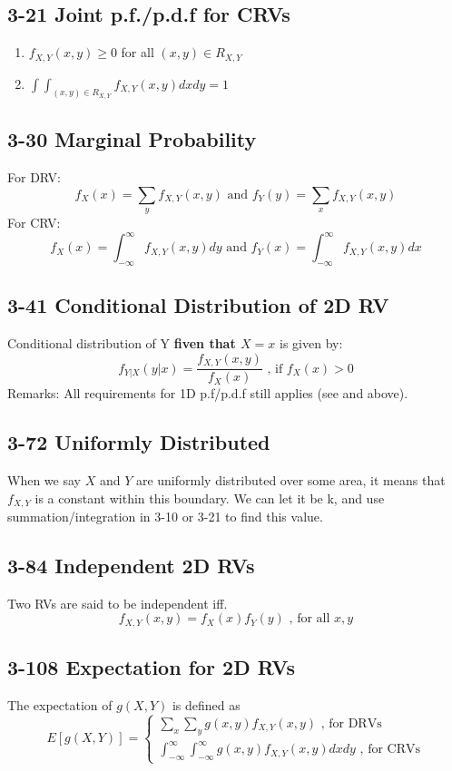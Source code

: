 \documentclass[12pt,landscape]{article}
\begin{document}
\begin{multicols}{3}
    \subsection{3-21 Joint p.f./p.d.f for CRVs}
    \begin{enumerate}
        \item $f_{X,Y}(x,y) \geq 0$ for all $(x, y) \in R_{X,Y}$
        \item $\int\int_{(x,y) \in R_{X,Y}} f_{X,Y}(x,y)dxdy = 1$
    \end{enumerate}
    
    \subsection{3-30 Marginal Probability}
    For DRV:
        $$ f_X(x) = \sum_y f_{X,Y}(x,y) \text{ and } f_Y(y) = \sum_x f_{X,Y}(x,y) $$
    For CRV:
        $$ f_X(x) = \int_{-\infty}^{\infty} f_{X,Y}(x,y)dy \text{ and } f_Y(x) = \int_{-\infty}^{\infty} f_{X,Y}(x,y)dx $$
    
    \subsection{3-41 Conditional Distribution of 2D RV}
    Conditional distribution of Y \textbf{fiven that $X = x$} is given by:
        $$ f_{Y|X}(y|x) = \frac{f_{X,Y}(x,y)}{f_X(x)} \text{ , if } f_X(x) > 0 $$
    Remarks: All requirements for 1D p.f/p.d.f still applies (see  and  above).

    \subsection{3-72 Uniformly Distributed}
    When we say $X$ and $Y$ are uniformly distributed over some area, it means that $f_{X,Y}$ is a constant
    within this boundary. We can let it be k, and use summation/integration in 3-10 or 3-21 to find this value.

    \subsection{3-84 Independent 2D RVs}
    Two RVs are said to be independent iff.
        $$ f_{X,Y}(x,y) = f_X(x)f_Y(y) \text{ , for all } x,y $$
    

    \subsection{3-108 Expectation for 2D RVs}
    The expectation of $g(X,Y)$ is defined as
        $$
            E[g(X,Y)] = \begin{cases}
                \sum_x \sum_y g(x,y)f_{X,Y}(x,y) \text{ , for DRVs} \\
                \int_{-\infty}^{\infty} \int_{-\infty}^{\infty} g(x,y)f_{X,Y}(x,y) dxdy \text{ , for CRVs}
            \end{cases}
        $$


\end{multicols}
\end{document}
